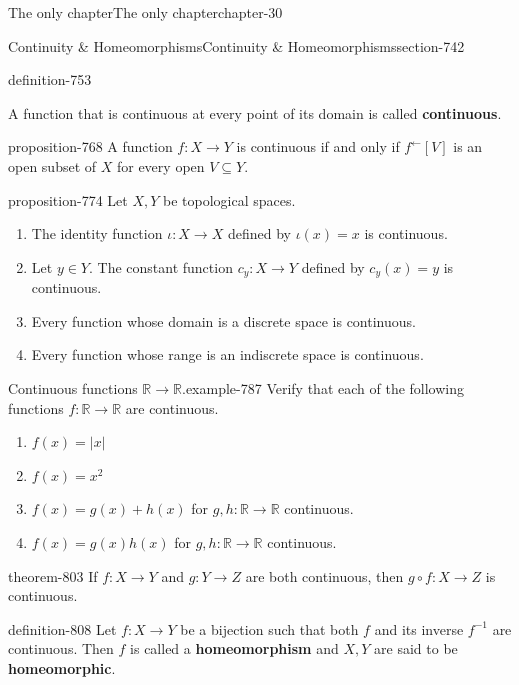 \documentclass[oneside,10pt,]{book}
\newcommand{\terminology}[1]{\textbf{#1}}
\newcommand{\mb}{\mathbb}
\begin{document}
\begin{chapterptx}{The only chapter}{}{The only chapter}{}{}{chapter-30}
\begin{sectionptx}{Continuity \& Homeomorphisms}{}{Continuity \& Homeomorphisms}{}{}{section-742}
\begin{definition}{}{definition-753}
\par
\hypertarget{p-766}{}%
A function that is continuous at every point of its domain is called \terminology{continuous}.%
\end{definition}
\begin{proposition}{}{}{proposition-768}%
\hypertarget{p-769}{}%
A function \(f:X\to Y\) is continuous if and only if \(f^\leftarrow[V]\) is an open subset of \(X\) for every open \(V\subseteq Y\).%
\end{proposition}
\begin{proposition}{}{}{proposition-774}%
\hypertarget{p-775}{}%
Let \(X,Y\) be topological spaces.%
\leavevmode%
\begin{enumerate}
\item\hypertarget{li-778}{}The identity function \(\iota:X\to X\) defined by \(\iota(x)=x\) is continuous.%
\item\hypertarget{li-781}{}Let \(y\in Y\). The constant function \(c_y:X\to Y\) defined by \(c_y(x)=y\) is continuous.%
\item\hypertarget{li-785}{}Every function whose domain is a discrete space is continuous.%
\item\hypertarget{li-786}{}Every function whose range is an indiscrete space is continuous.%
\end{enumerate}
\end{proposition}
\begin{example}{Continuous functions \(\mb R\to\mb R\).}{example-787}%
\hypertarget{p-790}{}%
Verify that each of the following functions \(f:\mb R\to\mb R\) are continuous.%
\leavevmode%
\begin{enumerate}
\item\hypertarget{li-793}{}\(f(x)=|x|\)%
\item\hypertarget{li-795}{}\(f(x)=x^2\)%
\item\hypertarget{li-797}{}\(f(x)=g(x)+h(x)\) for \(g,h:\mb R\to\mb R\) continuous.%
\item\hypertarget{li-800}{}\(f(x)=g(x)h(x)\) for \(g,h:\mb R\to\mb R\) continuous.%
\end{enumerate}
\end{example}
\begin{theorem}{}{}{theorem-803}%
\hypertarget{p-804}{}%
If \(f:X\to Y\) and \(g:Y\to Z\) are both continuous, then \(g\circ f:X\to Z\) is continuous.%
\end{theorem}
\begin{definition}{}{definition-808}%
\hypertarget{p-809}{}%
Let \(f:X\to Y\) be a bijection such that both \(f\) and its inverse \(f^{-1}\) are continuous. Then \(f\) is called a \terminology{homeomorphism} and \(X,Y\) are said to be \terminology{homeomorphic}.%

\end{definition}
\end{sectionptx}
\end{chapterptx}
\end{document}
